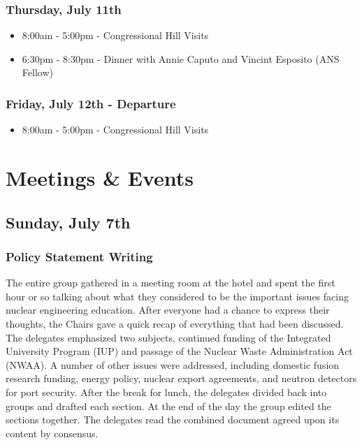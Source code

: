 \subsubsection*{Thursday, July 11th}
\begin{itemize}
  \item 8:00am - 5:00pm - Congressional Hill Visits
  \item 6:30pm - 8:30pm - Dinner with Annie Caputo and Vincint Esposito (ANS
    Fellow)
\end{itemize}

\subsubsection*{Friday, July 12th - Departure}
\begin{itemize}
  \item 8:00am - 5:00pm - Congressional Hill Visits
\end{itemize}

\section{Meetings \& Events}

\subsection*{Sunday, July 7th}

\subsubsection*{Policy Statement Writing}

The entire group gathered in a meeting room at the hotel and spent the first
hour or so talking about what they considered to be the important issues facing
nuclear engineering education. After everyone had a chance to express their
thoughts, the Chairs gave a quick recap of everything that had been
discussed. The delegates emphasized two subjects, continued funding of the
Integrated University Program (IUP) and passage of the Nuclear Waste
Administration Act (NWAA). A number of other issues were addressed, including
domestic fusion research funding, energy policy, nuclear export agreements, and
neutron detectors for port security. After the break for lunch, the delegates
divided back into groups and drafted each section. At the end of the day the
group edited the sections together. The delegates read the combined document
agreed upon its content by consensus.  

